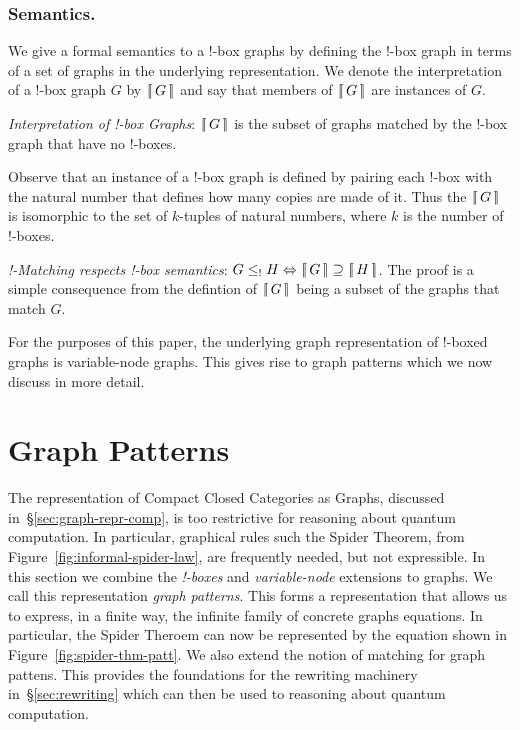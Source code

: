 \documentclass[runningheads]{llncs}
\newcommand{\binterp}[1]{\lceil\hspace{-0.27em}|\, #1\, |\hspace{-0.27em}\rceil}
\begin{document}
\subsubsection{Semantics.} 

We give a formal semantics to a !-box graphs by defining the !-box
graph in terms of a set of graphs in the underlying representation. We
denote the interpretation of a !-box graph $G$ by $\binterp{G}$ and
say that members of $\binterp{G}$ are instances of $G$.

\begin{definition}
  \emph{Interpretation of !-box Graphs}: $\binterp{G}$ is the subset
  of graphs matched by the !-box graph that have no !-boxes.
\end{definition}

Observe that an instance of a !-box graph is defined by pairing each
!-box with the natural number that defines how many copies are made of
it. Thus the $\binterp{G}$ is isomorphic to the set of $k$-tuples of
natural numbers, where $k$ is the number of !-boxes.

\begin{theorem}
\label{thm:bang-box-respect}
\emph{!-Matching respects !-box semantics}: $G \leq_! H
\Leftrightarrow \binterp{G} \supseteq \binterp{H}$. The proof is a
simple consequence from the defintion of $\binterp{G}$ being a subset
of the graphs that match $G$.
\end{theorem}

For the purposes of this paper, the underlying graph representation of
!-boxed graphs is variable-node graphs. This gives rise to graph
patterns which we now discuss in more detail.

\section{Graph Patterns}
\label{sec:patterns}

The representation of Compact Closed Categories as Graphs, discussed
in~\S\ref{sec:graph-repr-comp}, is too restrictive for reasoning about
quantum computation. In particular, graphical rules such the Spider
Theorem, from Figure~\ref{fig:informal-spider-law}, are frequently
needed, but not expressible. In this section we combine the {\em
  !-boxes} and {\em variable-node} extensions to graphs. We call this
representation \emph{graph patterns}. This forms a representation that
allows us to express, in a finite way, the infinite family of concrete
graphs equations. In particular, the Spider Theroem can now be
represented by the equation shown in Figure~\ref{fig:spider-thm-patt}.
We also extend the notion of matching for graph pattens.
This provides the foundations for the rewriting machinery
in~\S\ref{sec:rewriting} which can then be used to reasoning about
quantum computation.
\end{document}

